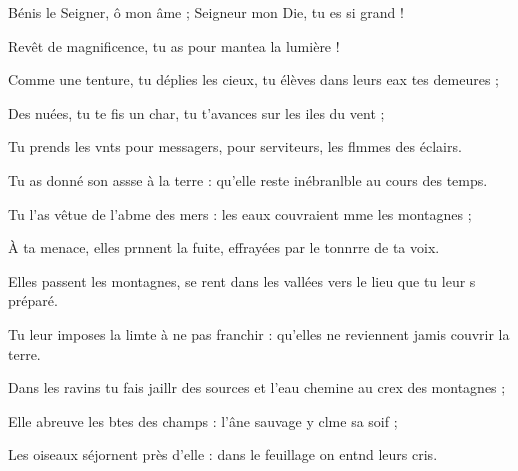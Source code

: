 \item Bénis le Seigner, ô mon âme ;\psstar{} Seigneur mon Die, tu es si grand ! 
\item Revêt de magnificence,\psstar{} tu as pour mantea la lumière ! 
\item Comme une tenture, tu déplies les cieux,\psstar{} tu élèves dans leurs eax tes demeures ; 
\item Des nuées, tu te fis un char,\psstar{} tu t’avances sur les iles du vent ;
\item Tu prends les vnts pour messagers,\psstar{} pour serviteurs, les flmmes des éclairs.
\item Tu as donné son assse à la terre :\psstar{} qu’elle reste inébranlble au cours des temps.
\item Tu l’as vêtue de l’abme des mers :\psstar{} les eaux couvraient mme les montagnes ;
\item À ta menace, elles prnnent la fuite,\psstar{} effrayées par le tonnrre de ta voix.
\item Elles passent les montagnes, se rent dans les vallées\psstar{} vers le lieu que tu leur s préparé.
\item Tu leur imposes la limte à ne pas franchir :\psstar{} qu’elles ne reviennent jamis couvrir la terre.
\item Dans les ravins tu fais jaillr des sources\psstar{} et l’eau chemine au crex des montagnes ;
\item Elle abreuve les btes des champs :\psstar{} l’âne sauvage y clme sa soif ;
\item Les oiseaux séjornent près d’elle :\psstar{} dans le feuillage on entnd leurs cris.